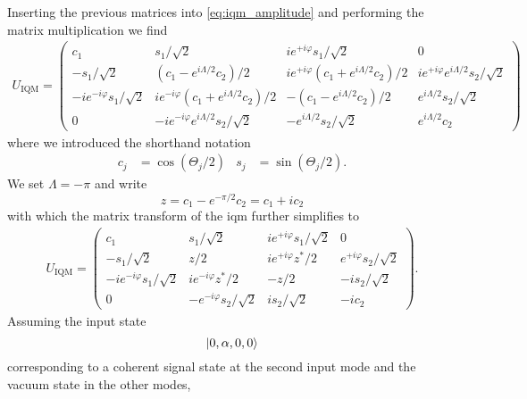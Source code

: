 Inserting the previous matrices into \cref{eq:iqm_amplitude} and performing the matrix multiplication we find
\begin{equation}
	\begin{split}
		U_\text{IQM}
		=
		\begin{pmatrix}
			c_1
			&
			s_1/\sqrt{2}
			&
			ie^{+i\varphi}s_1/\sqrt{2}
			&
			0
			\\
			-s_1/\sqrt{2}
			&
			\left(c_1-e^{i\Lambda/2}c_2\right)/2
			&
			ie^{+i\varphi}\left(c_1+e^{i\Lambda/2}c_2\right)/2
			&
			ie^{+i\varphi}e^{i\Lambda/2}s_2/\sqrt{2}
			\\
			-ie^{-i\varphi}s_1/\sqrt{2}
			&
			ie^{-i\varphi}\left(c_1+e^{i\Lambda/2}c_2\right)/2
			&
			-\left(c_1-e^{i\Lambda/2}c_2\right)/2
			&
			e^{i\Lambda/2}s_2/\sqrt{2}
			\\
			0
			&
			-ie^{-i\varphi}e^{i\Lambda/2}s_2/\sqrt{2}
			&
			-e^{i\Lambda/2}s_2/\sqrt{2}
			&
			e^{i\Lambda/2}c_2
		\end{pmatrix}
	\end{split}
\end{equation}
where we introduced the shorthand notation
\begin{align}
	c_j
	&=
	\cos(\Theta_j/2)
	&
	s_j
	&=
	\sin(\Theta_j/2)
	.
\end{align}
We set $\Lambda=-\pi$ and write
\begin{equation}
	z
	=
	c_1
	-
	e^{-\pi/2}
	c_2
	=
	c_1
	+
	ic_2
\end{equation}
with which the matrix transform of the \gls{iqm} further simplifies to
\begin{equation}
	\begin{split}
		U_\text{IQM}
		=
		\begin{pmatrix}
			c_1
			&
			s_1/\sqrt{2}
			&
			ie^{+i\varphi}s_1/\sqrt{2}
			&
			0
			\\
			-s_1/\sqrt{2}
			&
			z/2
			&
			ie^{+i\varphi}z^*/2
			&
			e^{+i\varphi}s_2/\sqrt{2}
			\\
			-ie^{-i\varphi}s_1/\sqrt{2}
			&
			ie^{-i\varphi}z^*/2
			&
			-z/2
			&
			-is_2/\sqrt{2}
			\\
			0
			&
			-e^{-i\varphi}s_2/\sqrt{2}
			&
			is_2/\sqrt{2}
			&
			-ic_2
		\end{pmatrix}
		.
	\end{split}
\end{equation}
Assuming the input state
\begin{equation}
	\ket{0,\alpha,0,0}
\end{equation}
corresponding to a coherent signal state at the second input mode and the vacuum state in the other modes,
